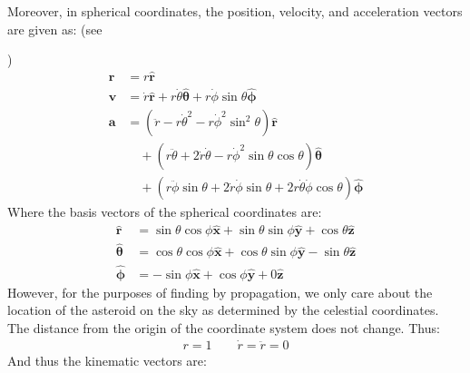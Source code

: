 \documentclass[letterpaper,11pt,english]{sphinxmanual}
\begin{document}
\sphinxAtStartPar
Moreover, in spherical coordinates, the position, velocity, and acceleration
vectors are given as: (see %
\begin{footnote}[55]\sphinxAtStartFootnote
{}
%
\end{footnote})
\begin{equation*}
\begin{split}\mathbf{r} &= r \mathbf{\hat r} \\
\mathbf{v} &= \dot{r} \mathbf{\hat r} + r \dot\theta \hat{\boldsymbol\theta } + r \dot\phi \sin\theta \mathbf{\hat{\boldsymbol\phi}} \\
\mathbf{a} &= \left(\ddot{r} - r\dot\theta^2 - r\dot\phi^2\sin^2\theta \right)\mathbf{\hat r} \\
 &\quad + \left( r\ddot\theta + 2\dot{r}\dot\theta - r\dot\phi^2\sin\theta\cos\theta \right) \hat{\boldsymbol\theta } \\
 &\quad + \left( r\ddot\phi\sin\theta + 2\dot{r}\dot\phi\sin\theta + 2 r\dot\theta\dot\phi\cos\theta \right) \hat{\boldsymbol\phi}\end{split}
\end{equation*}
\sphinxAtStartPar
Where the basis vectors of the spherical coordinates are:
\begin{equation*}
\begin{split}\hat{\mathbf r} &= \sin\theta \cos\phi \hat{\mathbf x} + \sin\theta \sin\phi \hat{\mathbf y} + \cos\theta \hat{\mathbf z} \\
\hat{\boldsymbol\theta} &= \cos\theta \cos\phi \hat{\mathbf x} + \cos\theta \sin\phi \hat{\mathbf y} - \sin\theta \hat{\mathbf z} \\
\hat{\boldsymbol\phi} &= - \sin\phi \hat{\mathbf x} + \cos\phi \hat{\mathbf y} + 0 \hat{\mathbf z}\end{split}
\end{equation*}
\sphinxAtStartPar
However, for the purposes of finding by propagation, we only care about the
location of the asteroid on the sky as determined by the celestial coordinates.
The distance from the origin of the coordinate system does not change. Thus:
\begin{equation*}
\begin{split}r = 1 \qquad \dot{r} = \ddot{r} = 0\end{split}
\end{equation*}
\sphinxAtStartPar
And thus the kinematic vectors are:
\end{document}
